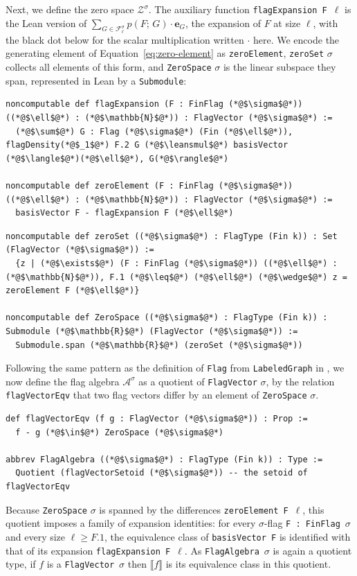 \documentclass[acmsmall,screen=true,acmthm=false]{acmart}
\newcommand{\den}[2]{p(#1;\,#2)}
\DeclareRobustCommand{\lean}[1]{{\def\_{\textunderscore\allowbreak}\texttt{#1}}}
\newcommand{\leansmul}{\mathbin{\vcenter{\hbox{$\scriptstyle\bullet$}}}}
\begin{document}
Next, we define the zero space $\mathcal{Z}^\sigma$.  The auxiliary function
\lean{flagExpansion F}~$\ell$ is the Lean version of
$\sum_{G \in \mathcal{F}^\sigma_\ell} \den{F}{G}\cdot \mathbf e_G$, the expansion of
$F$ at size $\ell$, with the black dot below for the scalar multiplication
written $\cdot$ here.  We encode the generating element of
Equation~\eqref{eq:zero-element} as \lean{zeroElement}, \lean{zeroSet} $\sigma$
collects all elements of this form, and \lean{ZeroSpace} $\sigma$ is the
linear subspace they span, represented in Lean by a \lean{Submodule}:
\begin{lstlisting}
noncomputable def flagExpansion (F : FinFlag (*@$\sigma$@*)) ((*@$\ell$@*) : (*@$\mathbb{N}$@*)) : FlagVector (*@$\sigma$@*) :=
  (*@$\sum$@*) G : Flag (*@$\sigma$@*) (Fin (*@$\ell$@*)), flagDensity(*@$_1$@*) F.2 G (*@$\leansmul$@*) basisVector (*@$\langle$@*)(*@$\ell$@*), G(*@$\rangle$@*)

noncomputable def zeroElement (F : FinFlag (*@$\sigma$@*)) ((*@$\ell$@*) : (*@$\mathbb{N}$@*)) : FlagVector (*@$\sigma$@*) :=
  basisVector F - flagExpansion F (*@$\ell$@*)
\end{lstlisting}
\begin{lstlisting}
noncomputable def zeroSet ((*@$\sigma$@*) : FlagType (Fin k)) : Set (FlagVector (*@$\sigma$@*)) :=
  {z | (*@$\exists$@*) (F : FinFlag (*@$\sigma$@*)) ((*@$\ell$@*) : (*@$\mathbb{N}$@*)), F.1 (*@$\leq$@*) (*@$\ell$@*) (*@$\wedge$@*) z = zeroElement F (*@$\ell$@*)}

noncomputable def ZeroSpace ((*@$\sigma$@*) : FlagType (Fin k)) : Submodule (*@$\mathbb{R}$@*) (FlagVector (*@$\sigma$@*)) :=
  Submodule.span (*@$\mathbb{R}$@*) (zeroSet (*@$\sigma$@*))
\end{lstlisting}
Following the same pattern as the definition of \lean{Flag} from
\lean{LabeledGraph} in , we now define the flag algebra
$\mathcal{A}^\sigma$ as a quotient of \lean{FlagVector} $\sigma$, by the
relation \lean{flagVectorEqv} that two flag vectors differ by an element of
\lean{ZeroSpace} $\sigma$.
\begin{lstlisting}
def flagVectorEqv (f g : FlagVector (*@$\sigma$@*)) : Prop :=
  f - g (*@$\in$@*) ZeroSpace (*@$\sigma$@*)

abbrev FlagAlgebra ((*@$\sigma$@*) : FlagType (Fin k)) : Type :=
  Quotient (flagVectorSetoid (*@$\sigma$@*)) -- the setoid of flagVectorEqv
\end{lstlisting}
Because \lean{ZeroSpace} $\sigma$ is spanned by the differences
\lean{zeroElement F}~$\ell$, this quotient imposes a family of expansion
identities: for every $\sigma$-flag \lean{F : FinFlag}~$\sigma$ and every size
$\ell \geq F.1$, the equivalence class of \lean{basisVector F} is identified
with that of its expansion \lean{flagExpansion F}~$\ell$.  As
\lean{FlagAlgebra}~$\sigma$ is again a quotient type, if $f$ is a
\lean{FlagVector}~$\sigma$ then $\llbracket f\rrbracket$ is its equivalence
class in this quotient.
\end{document}
